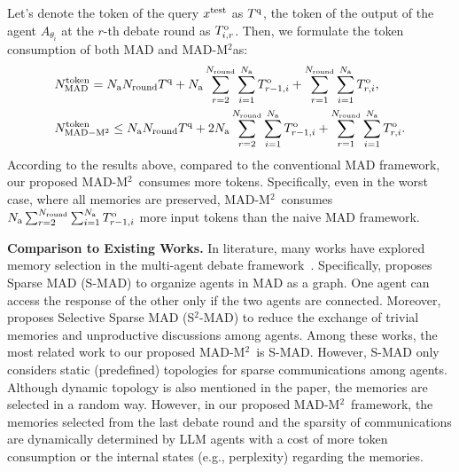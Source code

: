 \documentclass{article} %
\newcommand{\methodname}{MAD-M$^2$}
\newcommand{\uprmvar}[2]{#1^{\rm #2}}
\theoremstyle{plain}
\begin{document}
Let's denote the token of the query $\uprmvar{x}{test}$ as $\uprmvar{T}{q}$, the token of the output of the agent $A_{\theta_i}$ at the $r$-th debate round as $\uprmvar{T}{o}_{i, r}$. Then, we formulate the token consumption of both MAD and \methodname as:
\[
\begin{aligned}
    &\uprmvar{N}{token}_{\rm MAD} = N_{\rm a}N_{\rm round}\uprmvar{T}{q}  +  N_{\rm a}\sum_{r=2}^{N_{\rm round}}\sum_{i=1}^{N_{\rm a}}\uprmvar{T}{o}_{r-1, i}+\sum_{r=1}^{N_{\rm round}}\sum_{i=1}^{N_{\rm a}}\uprmvar{T}{o}_{r, i},\\
    &\uprmvar{N}{token}_{\rm MAD-M^2}\leq N_{\rm a}N_{\rm round}\uprmvar{T}{q}  +  2N_{\rm a}\sum_{r=2}^{N_{\rm round}}\sum_{i=1}^{N_{\rm a}}\uprmvar{T}{o}_{r-1, i}+\sum_{r=1}^{N_{\rm round}}\sum_{i=1}^{N_{\rm a}}\uprmvar{T}{o}_{r, i}.
\end{aligned}
\]
According to the results above, compared to the conventional MAD framework, our proposed \methodname\ consumes more tokens. Specifically, even in the worst case, where all memories are preserved, \methodname\ consumes $N_{\rm a}\sum_{r=2}^{N_{\rm round}}\sum_{i=1}^{N_{\rm a}}\uprmvar{T}{o}_{r-1, i}$ more input tokens than the naive MAD framework.

\textbf{Comparison to Existing Works.} In literature, many works have explored memory selection in the multi-agent debate framework~\citep{groupdebate,li2024improving,s2_mad}. Specifically, \cite{li2024improving} proposes Sparse MAD (S-MAD) to organize agents in MAD as a graph. One agent can access the response of the other only if the two agents are connected. Moreover, \cite{s2_mad} proposes Selective Sparse MAD (S$^2$-MAD) to reduce the exchange of trivial memories and unproductive discussions among agents. Among these works, the most related work to our proposed \methodname\ is S-MAD. However, S-MAD only considers static (predefined) topologies for sparse communications among agents. Although dynamic topology is also mentioned in the paper, the memories are selected in a random way. However, in our proposed \methodname\ framework, the memories selected from the last debate round and the sparsity of communications are dynamically determined by LLM agents with a cost of more token consumption or the internal states (e.g., perplexity) regarding the memories.
\end{document}
